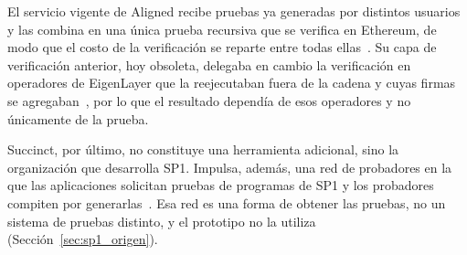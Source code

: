 El servicio vigente de Aligned recibe pruebas ya generadas por distintos usuarios y las combina en
una única prueba recursiva que se verifica en Ethereum, de modo que el costo de la verificación se
reparte entre todas ellas~\cite{aligneddocs}. Su capa de verificación
anterior, hoy obsoleta, delegaba en cambio la verificación en operadores de EigenLayer que la
reejecutaban fuera de la cadena y cuyas firmas se agregaban~\cite{alignedarchive}, por lo que el
resultado dependía de esos operadores y no únicamente de la prueba.

Succinct, por último, no constituye una herramienta adicional, sino la organización que desarrolla
SP1. Impulsa, además, una red de probadores en la que las aplicaciones solicitan pruebas de
programas de SP1 y los probadores compiten por generarlas~\cite{succinctnetwork}. Esa red es una
forma de obtener las pruebas, no un sistema de pruebas distinto, y el prototipo no la utiliza
(Sección~\ref{sec:sp1_origen}).

